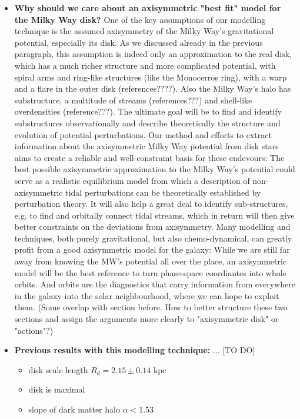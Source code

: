 \documentclass[12pt,preprint]{aastex}
\begin{document}
\begin{itemize}
[TO DO] (Maybe cite Potzen 2015, who showed that analysing aspherical systems in spherical actions can still be a powerful tool, when used with care...)

\item \textbf{Why should we care about an axisymmetric "best fit" model for the Milky Way disk?} One of the key assumptions of our modelling technique is the assumed axisymmetry of the Milky Way's gravitational potential, especially its disk. As we discussed already in the previous paragraph, this assumption is indeed only an approximation to the real disk, which has a much richer structure and more complicated potential, with spiral arms and ring-like structures (like the Monocerros ring), with a warp and a flare in the outer disk (references????). Also the Milky Way's halo has substructure, a multitude of streams (references???) and shell-like overdensities (reference???). The ultimate goal will be to find and identify substructures observationally and describe theoretically the structure and evolution of potential perturbations. Our method and efforts  to extract information about the axisymmetric Milky Way potential from disk stars aims to create a reliable and well-constraint basis for these endevours: The best possible axisymmetric approximation to the Milky Way's potential could serve as a realistic equilibrium model from which a description of non-axisymmetric tidal perturbations can be theoretically established by perturbation theory. It will also help a great deal to identify sub-structures, e.g. to find and orbitally connect tidal streams, which in return will then give better constraints on the deviations from axisymmetry. Many modelling and techniques, both purely gravitational, but also chemo-dynamical, can greatly profit from a good axisymmetric model for the galaxy: While we are still far away from knowing the MW's potential all over the place, an axisymmetric model will be the best reference to turn phase-space coordiantes into whole orbits. And orbits are the diagnostics that carry information from everywhere in the galaxy into the solar neighbourhood, where we can hope to exploit them. (Some overlap with section before. How to better structure these two sections and assign the arguments more clearly to "axisymmetric disk" or "actions"?) 

\item \textbf{Previous results with this modelling technique:} \citet{bov13} ... [TO DO]
\begin{itemize}
\item disk scale length $R_d = 2.15 \pm 0.14 \text{ kpc }$ \citep{bov13}
\item disk is maximal \citep{bov13}
\item slope of dark matter halo $\alpha < 1.53$ \citep{bov13}
\end{itemize}


\end{itemize}
\end{document}
